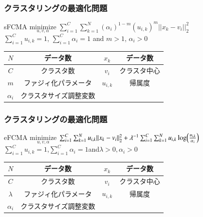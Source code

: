 \documentclass[13pt,dvipdfmx]{beamer}
\begin{document}
\begin{frame}\frametitle{クラスタリングの最適化問題}
  \begin{block}{sFCMA}
    \quad$\underset{u,v,\alpha}{\text{minimize}}$
    $\sum_{i=1}^C\sum_{k=1}^N(\alpha_{i})^{1-m}(u_{i,k})^m||x_k-v_i||_2^2$\\
    \qquad\qquad{}$\sum_{i=1}^Cu_{i,k}=1$\;, \;$\sum_{i=1}^C\alpha_{i}=1$\; and \;$m>1$\;, \;$\alpha_{i}>0$
  \end{block}
  \begin{center}
    \begin{tabular}{c|c||c|c} \hline
	  {$N$}&データ数&{$x_k$}&データ数 \\ \hline
	  {$C$}&クラスタ数&{$v_i$}&クラスタ中心\\ \hline
	  {$m$}&ファジィ化パラメータ&{$u_{i,k}$}&帰属度 \\ \hline
	  {$\alpha_i$}&クラスタサイズ調整変数\\ \hline
    \end{tabular}
  \end{center}
\end{frame}

\begin{frame}\frametitle{クラスタリングの最適化問題}
  \begin{block}{eFCMA}
    \quad$\underset{u,v,\alpha}{\text{minimize}}$
    $\sum_{i=1}^C\sum_{k=1}^Nu_{i,k}||x_k-v_i||_2^2+\lambda^{-1}\sum_{i=1}^C\sum_{k=1}^Nu_{i,k}\log\Bigl(\frac{u_{i,k}}{\alpha_{i}}\Bigl)$\\
    \qquad\qquad\qquad{}$\sum_{i=1}^Cu_{i,k}=1$\;,\;$\sum_{i=1}^C\alpha_{i}=1$\;and\;$\lambda>0,$\quad$\alpha_{i}>0$
  \end{block}
  \begin{center}
    \begin{tabular}{c|c||c|c} \hline
	  {$N$}&データ数&{$x_k$}&データ数 \\ \hline
	  {$C$}&クラスタ数&{$v_i$}&クラスタ中心\\ \hline
	  {$\lambda$}&ファジィ化パラメータ&{$u_{i,k}$}&帰属度 \\ \hline
	  {$\alpha_i$}&クラスタサイズ調整変数\\ \hline
    \end{tabular}
  \end{center}
\end{frame}
\end{document}
